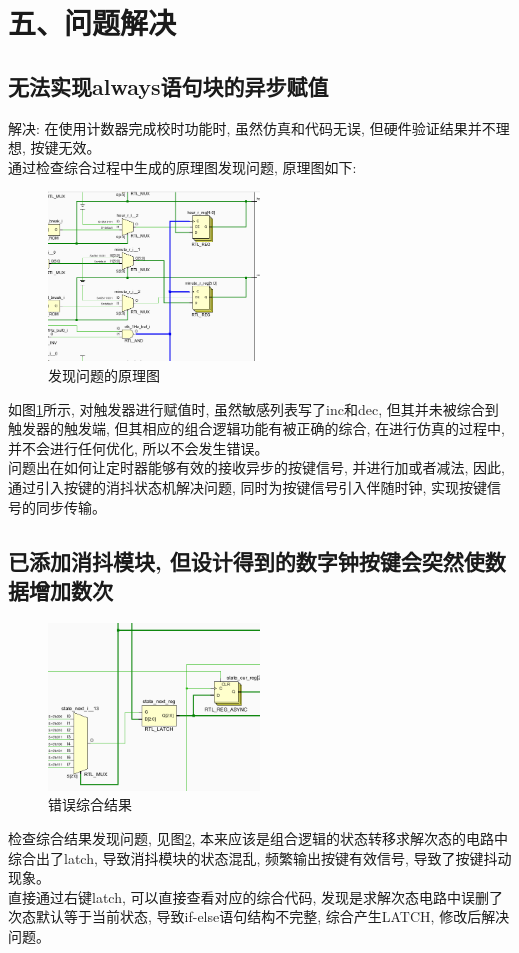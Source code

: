 \documentclass{article}
\newcommand{\fourhao}{\fontsize{14pt}{\baselineskip}\selectfont} %
\newcommand{\xiaosihao}{\fontsize{12pt}{\baselineskip}\selectfont} %
\begin{document}
\section*{\fourhao 五、问题解决}
\xiaosihao
{}
\subsection*{无法实现always语句块的异步赋值}
解决: 在使用计数器完成校时功能时, 虽然仿真和代码无误, 但硬件验证结果并不理想, 按键无效。\\
通过检查综合过程中生成的原理图发现问题, 原理图如下:
\begin{figure}[htbp]
    \centering
    \includegraphics[width=0.5\textwidth]{image/2024-06-24-19-51-58.png}
    \caption{发现问题的原理图}
    \label{image_QA_1}
\end{figure}
如图\ref{image_QA_1}所示, 对触发器进行赋值时, 虽然敏感列表写了inc和dec, 但其并未被综合到触发器的触发端, 但其相应的组合逻辑功能有被正确的综合, 在进行仿真的过程中, 并不会进行任何优化, 所以不会发生错误。\\
问题出在如何让定时器能够有效的接收异步的按键信号, 并进行加或者减法, 因此, 通过引入按键的消抖状态机解决问题, 同时为按键信号引入伴随时钟, 实现按键信号的同步传输。
\subsection*{已添加消抖模块, 但设计得到的数字钟按键会突然使数据增加数次}
\begin{figure}[htbp]
    \centering
    \includegraphics[width=0.5\textwidth]{image/2024-06-24-22-21-16.png}
    \caption{错误综合结果}
    \label{image_QA_2}
\end{figure}
检查综合结果发现问题, 见图\ref{image_QA_2}, 本来应该是组合逻辑的状态转移求解次态的电路中综合出了latch, 导致消抖模块的状态混乱, 频繁输出按键有效信号, 导致了按键抖动现象。\\
直接通过右键latch, 可以直接查看对应的综合代码, 发现是求解次态电路中误删了次态默认等于当前状态, 导致if-else语句结构不完整, 综合产生LATCH, 修改后解决问题。
\end{document}
